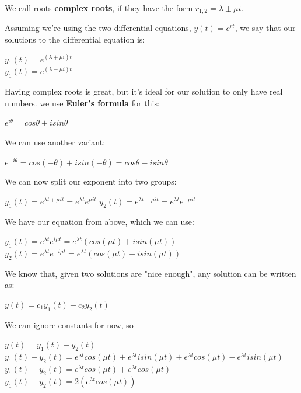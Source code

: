 \documentclass{article}
\begin{document}
We call roots \textbf{complex roots}, if they have the form $r_{1,2} = \lambda \pm \mu i$.

Assuming we're using the two differential equations, $y(t) = e^{rt}$, we say that our solutions to the differential equation is: 

\begin{center}
    $y_1 (t) = e^{(\lambda + \mu i) t}$ \\
    $y_1 (t) = e^{(\lambda - \mu i) t}$
\end{center}

Having complex roots is great, but it's ideal for our solution to only have real numbers. we use \textbf{Euler's formula} for this:

\begin{center}
    $e^{i\theta} = cos\theta + isin\theta$
\end{center}

We can use another variant:

\begin{center}
    $e^{-i\theta} = cos(-\theta) + isin(-\theta) = cos\theta - isin\theta$
\end{center}

We can now split our exponent into two groups:

\begin{center}
    $y_1(t) = e^{\lambda t + \mu i t} = e^{\lambda t} e^{\mu i t }$
    $y_2(t) = e^{\lambda t - \mu i t} = e^{\lambda t} e^{-\mu i t }$
\end{center}

We have our equation from above, which we can use:

\begin{center}
    $y_1(t) = e^{\lambda t} e^{i\mu t} = e^{\lambda t}(cos(\mu t) + isin(\mu t))$
    $y_2(t) = e^{\lambda t} e^{-i\mu t} = e^{\lambda t}(cos(\mu t) - isin(\mu t))$
\end{center}

We know that, given two solutions are "nice enough", any solution can be written as:

\begin{center}
$y(t) = c_1 y_1 (t) + c_2 y_2(t)$
\end{center}

We can ignore constants for now, so 

\begin{center}
    $y(t) = y_1(t) + y_2(t)$ \\
    $y_1(t) + y_2(t) = e^{\lambda t}cos(\mu t) + e^{\lambda t} i sin(\mu t) + e^{\lambda t} cos(\mu t) - e^{\lambda t}isin(\mu t)$ \\
    $y_1(t) + y_2(t) = e^{\lambda t}cos(\mu t) + e^{\lambda t} cos(\mu t)$  \\
    $y_1(t) + y_2(t) = 2(e^{\lambda t} cos(\mu t))$ 
\end{center}
\end{document}
